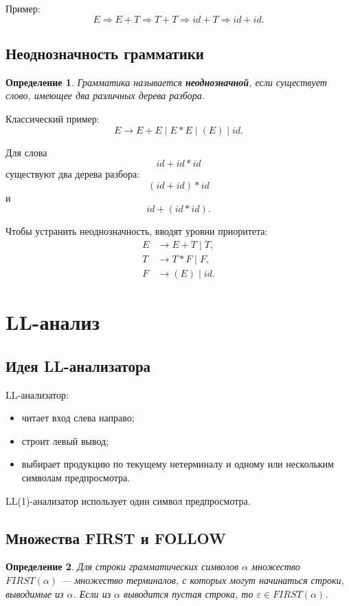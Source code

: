 \documentclass[12pt,a4paper]{article}
\newtheorem{definition}{Определение}
\begin{document}
Пример:
\[
E \Rightarrow E+T \Rightarrow T+T \Rightarrow id+T \Rightarrow id+id.
\]

\subsection{Неоднозначность грамматики}

\begin{definition}
Грамматика называется \textbf{неоднозначной}, если существует слово, имеющее два различных дерева разбора.
\end{definition}

Классический пример:
\[
E \to E+E \mid E*E \mid (E) \mid id.
\]

Для слова
\[
id+id*id
\]
существуют два дерева разбора:
\[
(id+id)*id
\]
и
\[
id+(id*id).
\]

Чтобы устранить неоднозначность, вводят уровни приоритета:
\[
\begin{aligned}
E &\to E+T \mid T,\\
T &\to T*F \mid F,\\
F &\to (E) \mid id.
\end{aligned}
\]

\section{LL-анализ}

\subsection{Идея LL-анализатора}

LL-анализатор:
\begin{itemize}
    \item читает вход слева направо;
    \item строит левый вывод;
    \item выбирает продукцию по текущему нетерминалу и одному или нескольким символам предпросмотра.
\end{itemize}

LL(1)-анализатор использует один символ предпросмотра.

\subsection{Множества FIRST и FOLLOW}

\begin{definition}
Для строки грамматических символов $\alpha$ множество $FIRST(\alpha)$ --- множество терминалов, с которых могут начинаться строки, выводимые из $\alpha$. Если из $\alpha$ выводится пустая строка, то $\varepsilon \in FIRST(\alpha)$.
\end{definition}
\end{document}
